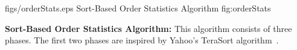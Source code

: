 

\onefigure
{figs/orderStats.eps}
{Sort-Based Order Statistics Algorithm}
{fig:orderStats}


\textbf{Sort-Based Order Statistics Algorithm:} This algorithm consists of three phases. The first two phases are inspired by Yahoo's TeraSort algorithm~\cite{terasort}.





